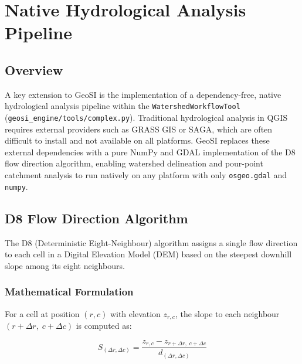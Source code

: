 

\chapter{Native Hydrological Analysis Pipeline}

\section{Overview}

A key extension to GeoSI is the implementation of a dependency-free, native
hydrological analysis pipeline within the \texttt{WatershedWorkflowTool}
(\texttt{geosi\_engine/tools/complex.py}).  Traditional hydrological analysis in
QGIS requires external providers such as GRASS GIS or SAGA, which are often
difficult to install and not available on all platforms.  GeoSI replaces these
external dependencies with a pure NumPy and GDAL implementation of the D8 flow
direction algorithm, enabling watershed delineation and pour-point catchment
analysis to run natively on any platform with only \texttt{osgeo.gdal} and
\texttt{numpy}.

\section{D8 Flow Direction Algorithm}

The D8 (Deterministic Eight-Neighbour) algorithm assigns a single flow direction
to each cell in a Digital Elevation Model (DEM) based on the steepest downhill
slope among its eight neighbours.

\subsection{Mathematical Formulation}

For a cell at position $(r, c)$ with elevation $z_{r,c}$, the slope to each
neighbour $(r + \Delta r,\; c + \Delta c)$ is computed as:

\[
S_{(\Delta r, \Delta c)} = \frac{z_{r,c} - z_{r+\Delta r,\; c+\Delta c}}{d_{(\Delta r,\Delta c)}}
\]

